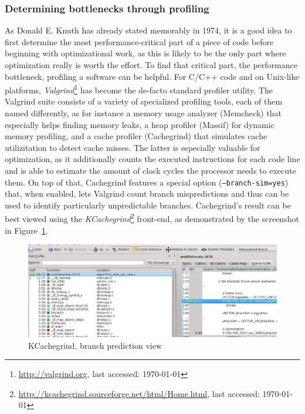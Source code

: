 \subsubsection{Determining bottlenecks through profiling}
As Donald E. Knuth has already stated memorably in 1974, it is a good idea to first determine the most performance-critical part of a piece of code before beginning with optimizational work, as this is likely to be the only part where optimization really is worth the effort. To find that critical part, the performance bottleneck, profiling a software can be helpful. For C/C++ code and on Unix-like platforms, \emph{Valgrind}\footnote{\url{http://valgrind.org}, last accessed: \today{}} has become the de-facto standard profiler utility. The Valgrind suite consists of a variety of specialized profiling tools, each of them named differently, as for instance a memory usage analyzer (Memcheck) that especially helps finding memory leaks, a heap profiler (Massif) for dynamic memory profiling, and a cache profiler (Cachegrind) that simulates cache utilizitation to detect cache misses. The latter is especially valuable for optimization, as it additionally counts the executed instructions for each code line and is able to estimate the amount of clock cycles the processor needs to execute them. On top of that, Cachegrind features a special option (\texttt{--branch-sim=yes}) that, when enabled, lets Valgrind count branch mispredictions and thus can be used to identify particularly unpredictable branches. Cachegrind's result can be best viewed using the \emph{KCachegrind}\footnote{\url{http://kcachegrind.sourceforge.net/html/Home.html}, last accessed: \today{}} front-end, as demonstrated by the screenshot in Figure~\ref{fig:kcachegrind}.
\begin{figure}[h]
\begin{center}
\includegraphics[width=14cm]{img/kcachegrind}
\end{center}
\caption{KCachegrind, branch prediction view}
\label{fig:kcachegrind}
\end{figure}


